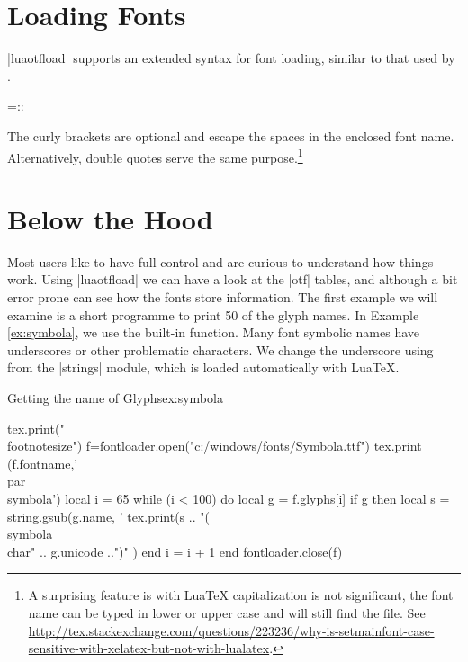 {\section{Loading Fonts}

|luaotfload| supports an extended syntax for font loading, similar to that used by \xetex.



\CMDI{\font}=::

The curly brackets are optional and escape the spaces in the enclosed
font name. Alternatively, double quotes serve the same purpose.\footnote{A surprising feature is with LuaTeX capitalization is not significant, the font name can be typed in lower or upper case and will still find the file. See \protect\url{http://tex.stackexchange.com/questions/223236/why-is-setmainfont-case-sensitive-with-xelatex-but-not-with-lualatex}.}

\section{Below the Hood}

Most \tex users like to have full control and are curious to understand how things work. Using |luaotfload| we can have a look at the |otf| tables, and although a bit error prone can 
see how the fonts store information. The first example we will examine is a short programme to print 50 of the glyph names. In Example \ref{ex:symbola}, we use the built-in   function. Many font symbolic names have underscores or other problematic characters. We change the underscore using  from the |strings| module, which is loaded automatically with LuaTeX.


\begin{texexample}{Getting the name of Glyphs}{ex:symbola}
\bgroup
\begin{luacode}
tex.print("\\footnotesize")
f=fontloader.open("c:/windows/fonts/Symbola.ttf")
tex.print (f.fontname,'\\par\\symbola')
local i = 65
while (i < 100) do  
local g = f.glyphs[i]
if g then
  local s = string.gsub(g.name, '%
  tex.print(s .. "(\\symbola\\char" .. g.unicode ..")" )
end
  i = i + 1
end
fontloader.close(f)
\end{luacode}
\egroup
\end{texexample}

}

